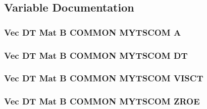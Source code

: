 \subsection{Variable Documentation}
\hypertarget{myts_8com_a04f74f75c95694d7f2517b1ad1bb88fc}{
\subsubsection[{A}]{\setlength{\rightskip}{0pt plus 5cm}Vec {\bf D\-T} Mat B C\-O\-M\-M\-O\-N M\-Y\-T\-S\-C\-O\-M A}}\label{myts_8com_a04f74f75c95694d7f2517b1ad1bb88fc}
\hypertarget{myts_8com_a41549d5ede5e2b840495daf35608da41}{
\subsubsection[{D\-T}]{\setlength{\rightskip}{0pt plus 5cm}Vec D\-T Mat B C\-O\-M\-M\-O\-N M\-Y\-T\-S\-C\-O\-M D\-T}}\label{myts_8com_a41549d5ede5e2b840495daf35608da41}
\hypertarget{myts_8com_accf7addb2159476a2ff0ba7d99b8bbbc}{
\subsubsection[{V\-I\-S\-C\-T}]{\setlength{\rightskip}{0pt plus 5cm}Vec {\bf D\-T} Mat B C\-O\-M\-M\-O\-N M\-Y\-T\-S\-C\-O\-M V\-I\-S\-C\-T}}\label{myts_8com_accf7addb2159476a2ff0ba7d99b8bbbc}
\hypertarget{myts_8com_a0c4fbcdb78e6b50c8919d714e4b5a694}{
\subsubsection[{Z\-R\-O\-E}]{\setlength{\rightskip}{0pt plus 5cm}Vec {\bf D\-T} Mat B C\-O\-M\-M\-O\-N M\-Y\-T\-S\-C\-O\-M Z\-R\-O\-E}}\label{myts_8com_a0c4fbcdb78e6b50c8919d714e4b5a694}
